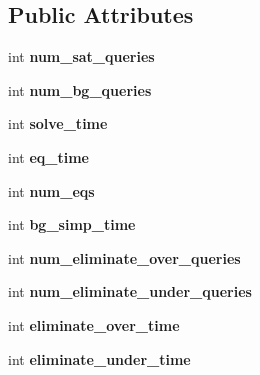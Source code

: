\subsection*{\-Public \-Attributes}
\begin{DoxyCompactItemize}
\item 
\hypertarget{classConstraintSolver_a428f43f77725a42cb687e6b8f1a75659}{int {\bfseries num\-\_\-sat\-\_\-queries}}\label{classConstraintSolver_a428f43f77725a42cb687e6b8f1a75659}

\item 
\hypertarget{classConstraintSolver_a4a51de72ac1a6f7d9b4859a693e13b32}{int {\bfseries num\-\_\-bg\-\_\-queries}}\label{classConstraintSolver_a4a51de72ac1a6f7d9b4859a693e13b32}

\item 
\hypertarget{classConstraintSolver_a9f59908ea8c64a3c84a741fae2ef3863}{int {\bfseries solve\-\_\-time}}\label{classConstraintSolver_a9f59908ea8c64a3c84a741fae2ef3863}

\item 
\hypertarget{classConstraintSolver_afe5a1e9e69d4bcda19df66c174f227b8}{int {\bfseries eq\-\_\-time}}\label{classConstraintSolver_afe5a1e9e69d4bcda19df66c174f227b8}

\item 
\hypertarget{classConstraintSolver_a1b839e1c89ee06cf4ea4755c1d6dfa0c}{int {\bfseries num\-\_\-eqs}}\label{classConstraintSolver_a1b839e1c89ee06cf4ea4755c1d6dfa0c}

\item 
\hypertarget{classConstraintSolver_a65bc63411057c6e5aced8dbda0bcf537}{int {\bfseries bg\-\_\-simp\-\_\-time}}\label{classConstraintSolver_a65bc63411057c6e5aced8dbda0bcf537}

\item 
\hypertarget{classConstraintSolver_a217574336ec6ec9862e575e7d93aa660}{int {\bfseries num\-\_\-eliminate\-\_\-over\-\_\-queries}}\label{classConstraintSolver_a217574336ec6ec9862e575e7d93aa660}

\item 
\hypertarget{classConstraintSolver_a81d497f5e7c223161c22fe00015018b9}{int {\bfseries num\-\_\-eliminate\-\_\-under\-\_\-queries}}\label{classConstraintSolver_a81d497f5e7c223161c22fe00015018b9}

\item 
\hypertarget{classConstraintSolver_a78d9dd4dd6078ef21fa43d3f2b888d7e}{int {\bfseries eliminate\-\_\-over\-\_\-time}}\label{classConstraintSolver_a78d9dd4dd6078ef21fa43d3f2b888d7e}

\item 
\hypertarget{classConstraintSolver_a20ce49c30eab87d24b390a6aaa942971}{int {\bfseries eliminate\-\_\-under\-\_\-time}}\label{classConstraintSolver_a20ce49c30eab87d24b390a6aaa942971}

\end{DoxyCompactItemize}
